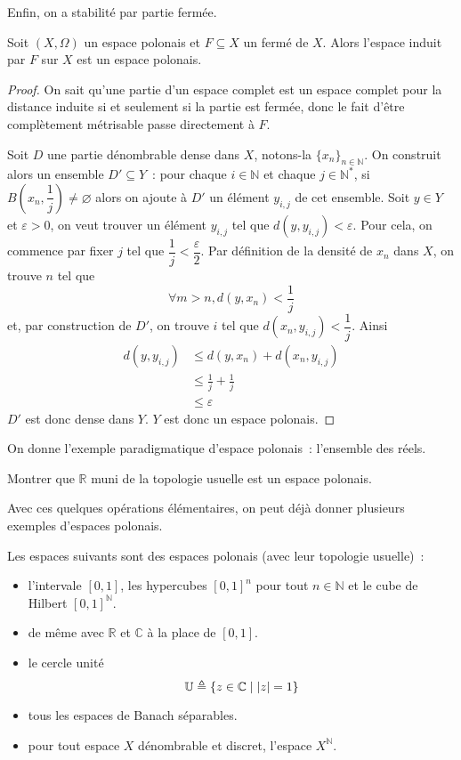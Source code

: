 Enfin, on a stabilité par partie fermée.

\begin{proposition}\label{desc.ferme.polonais}
  Soit $(X,\Omega)$ un espace polonais et $F\subseteq X$ un fermé de $X$. Alors
  l'espace induit par $F$ sur $X$ est un espace polonais.
\end{proposition}

\begin{proof}
  On sait qu'une partie d'un espace complet est un espace complet pour la
  distance induite si et seulement si la partie est fermée, donc le fait d'être
  complètement métrisable passe directement à $F$.
  
  Soit $D$ une partie dénombrable dense dans $X$, notons-la
  $\{x_n\}_{n\in\mathbb N}$. On construit alors un ensemble $D'\subseteq Y$~: pour
  chaque $i\in \mathbb N$ et chaque $j\in \mathbb N^*$, si
  $B\left(x_n,\dfrac{1}{j}\right)\neq\varnothing$ alors on ajoute à $D'$ un
  élément $y_{i,j}$ de cet ensemble. Soit $y\in Y$ et $\varepsilon > 0$, on veut
  trouver un élément $y_{i,j}$ tel que $d(y,y_{i,j}) < \varepsilon$. Pour cela,
  on commence par fixer $j$ tel que $\dfrac{1}{j} < \dfrac{\varepsilon}{2}$.
  Par définition de la densité de $x_n$ dans $X$, on trouve $n$ tel que
  \[\forall m > n, d(y,x_n) < \frac{1}{j}\]
  et, par construction de $D'$, on trouve $i$ tel que
  $d(x_n,y_{i,j})<\dfrac{1}{j}$. Ainsi
  \begin{align*}
    d(y,y_{i,j}) &\leq d(y,x_n) + d(x_n,y_{i,j})\\
    &\leq \frac{1}{j} + \frac{1}{j}\\
    &\leq \varepsilon
  \end{align*}
  $D'$ est donc dense dans $Y$. $Y$ est donc un espace polonais.
\end{proof}

On donne l'exemple paradigmatique d'espace polonais~: l'ensemble des réels.

\begin{exercise}
  Montrer que $\mathbb R$ muni de la topologie usuelle est un espace polonais.
\end{exercise}

Avec ces quelques opérations élémentaires, on peut déjà donner plusieurs
exemples d'espaces polonais.

\begin{example}
  Les espaces suivants sont des espaces polonais (avec leur topologie usuelle)~:
  \begin{itemize}
  \item l'intervale $[0,1]$, les hypercubes $[0,1]^n$ pour tout $n\in\mathbb N$
    et le cube de Hilbert $[0,1]^{\mathbb N}$.
  \item de même avec $\mathbb R$ et $\mathbb C$ à la place de $[0,1]$.
  \item le cercle unité \[\mathbb U \triangleq \{z\in \mathbb C\mid |z| = 1\}\]
  \item tous les espaces de Banach séparables.
  \item pour tout espace $X$ dénombrable et discret, l'espace $X^\mathbb N$.
  \end{itemize}
\end{example}

